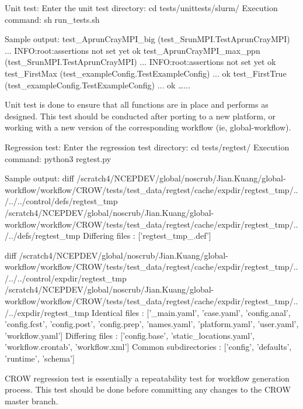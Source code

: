 Unit test\-: Enter the unit test directory\-: cd tests/unittests/slurm/ Execution command\-: sh run\-\_\-tests.\-sh

Sample output\-: test\-\_\-\-Aprun\-Cray\-M\-P\-I\-\_\-big (test\-\_\-\-Srun\-M\-P\-I.\-Test\-Aprun\-Cray\-M\-P\-I) ... I\-N\-F\-O\-:root\-:assertions not set yet ok test\-\_\-\-Aprun\-Cray\-M\-P\-I\-\_\-max\-\_\-ppn (test\-\_\-\-Srun\-M\-P\-I.\-Test\-Aprun\-Cray\-M\-P\-I) ... I\-N\-F\-O\-:root\-:assertions not set yet ok test\-\_\-\-First\-Max (test\-\_\-example\-Config.\-Test\-Example\-Config) ... ok test\-\_\-\-First\-True (test\-\_\-example\-Config.\-Test\-Example\-Config) ... ok …...

Unit test is done to ensure that all functions are in place and performs as designed. This test should be conducted after porting to a new platform, or working with a new version of the corresponding workflow (ie, global-\/workflow).

Regression test\-: Enter the regression test directory\-: cd tests/regtest/ Execution command\-: python3 regtest.\-py

Sample output\-: diff /scratch4/\-N\-C\-E\-P\-D\-E\-V/global/noscrub/\-Jian.Kuang/global-\/workflow/workflow/\-C\-R\-O\-W/tests/test\-\_\-data/regtest/cache/expdir/regtest\-\_\-tmp/../../../control/defs/regtest\-\_\-tmp /scratch4/\-N\-C\-E\-P\-D\-E\-V/global/noscrub/\-Jian.Kuang/global-\/workflow/workflow/\-C\-R\-O\-W/tests/test\-\_\-data/regtest/cache/expdir/regtest\-\_\-tmp/../../defs/regtest\-\_\-tmp Differing files \-: \mbox{[}'regtest\-\_\-tmp\-\_.\-def'\mbox{]}

diff /scratch4/\-N\-C\-E\-P\-D\-E\-V/global/noscrub/\-Jian.Kuang/global-\/workflow/workflow/\-C\-R\-O\-W/tests/test\-\_\-data/regtest/cache/expdir/regtest\-\_\-tmp/../../../control/expdir/regtest\-\_\-tmp /scratch4/\-N\-C\-E\-P\-D\-E\-V/global/noscrub/\-Jian.Kuang/global-\/workflow/workflow/\-C\-R\-O\-W/tests/test\-\_\-data/regtest/cache/expdir/regtest\-\_\-tmp/../../expdir/regtest\-\_\-tmp Identical files \-: \mbox{[}'\-\_\-main.\-yaml', 'case.\-yaml', 'config.\-anal', 'config.\-fcst', 'config.\-post', 'config.\-prep', 'names.\-yaml', 'platform.\-yaml', 'user.\-yaml', 'workflow.\-yaml'\mbox{]} Differing files \-: \mbox{[}'config.\-base', 'static\-\_\-locations.\-yaml', 'workflow.\-crontab', 'workflow.\-xml'\mbox{]} Common subdirectories \-: \mbox{[}'config', 'defaults', 'runtime', 'schema'\mbox{]}

C\-R\-O\-W regression test is essentially a repeatability test for workflow generation process. This test should be done before committing any changes to the C\-R\-O\-W master branch. 